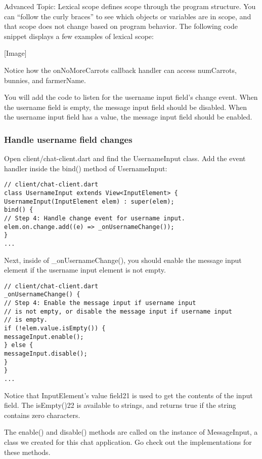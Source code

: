 Advanced Topic: Lexical scope defines scope through the program structure. You
can “follow the curly braces” to see which objects or variables are in scope, and that scope does not change based on program behavior. The following code snippet displays a few examples of lexical scope:

[Image]

Notice how the onNoMoreCarrots callback handler can access numCarrots,
bunnies, and farmerName.

You will add the code to listen for the username input field’s change event. When the username field is empty, the message input field should be disabled. When the username input field has a value, the message input field should be enabled.

\subsubsection{Handle username field changes}

Open client/chat-client.dart and find the UsernameInput class. Add the event
handler inside the bind() method of UsernameInput:

\begin{verbatim}
// client/chat-client.dart
class UsernameInput extends View<InputElement> {
UsernameInput(InputElement elem) : super(elem);
bind() {
// Step 4: Handle change event for username input.
elem.on.change.add((e) => _onUsernameChange());
}
...
\end{verbatim}

Next, inside of \_onUsernameChange(), you should enable the message input element if the username input element is not empty.

\begin{verbatim}
// client/chat-client.dart
_onUsernameChange() {
// Step 4: Enable the message input if username input
// is not empty, or disable the message input if username input
// is empty.
if (!elem.value.isEmpty()) {
messageInput.enable();
} else {
messageInput.disable();
}
}
...
\end{verbatim}

Notice that InputElement’s value field21 is used to get the contents of the input field. The isEmpty()22 is available to strings, and returns true if the string contains zero characters.

The enable() and disable() methods are called on the instance of MessageInput, a class we created for this chat application. Go check out the implementations for these methods.

